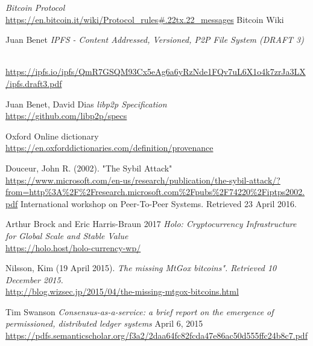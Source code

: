 \documentclass[twocolumn,showpacs,
  nofootinbib,aps,superscriptaddress,
  eqsecnum,prd,notitlepage,showkeys,10pt]{revtex4-1}
\begin{document}
\begin{thebibliography}{9}
\textit{Bitcoin Protocol}
\\\url{https://en.bitcoin.it/wiki/Protocol_rules#.22tx.22_messages}
Bitcoin Wiki

Juan Benet
\textit{IPFS - Content Addressed, Versioned, P2P File System (DRAFT 3)}
\begin{sloppypar}
\\\url{https://ipfs.io/ipfs/QmR7GSQM93Cx5eAg6a6yRzNde1FQv7uL6X1o4k7zrJa3LX/ipfs.draft3.pdf}
\end{sloppypar}

Juan Benet, David Dias
\textit{libp2p Specification}
\\\url{https://github.com/libp2p/specs}

Oxford
Online dictionary
\\\url{https://en.oxforddictionaries.com/definition/provenance}

Douceur, John R. (2002).
"The Sybil Attack"
\\\url{https://www.microsoft.com/en-us/research/publication/the-sybil-attack/?from=http%3A%2F%2Fresearch.microsoft.com%2Fpubs%2F74220%2Fiptps2002.pdf}
International workshop on Peer-To-Peer Systems. Retrieved 23 April 2016.


Arthur Brock and Eric Harris-Braun 2017
\textit{Holo: Cryptocurrency Infrastructure
for Global Scale and Stable Value}
\\\url{https://holo.host/holo-currency-wp/}

 Nilsson, Kim (19 April 2015).
 \textit{The missing MtGox bitcoins". Retrieved 10 December 2015.}
\\\url{http://blog.wizsec.jp/2015/04/the-missing-mtgox-bitcoins.html}

Tim Swanson
\textit{Consensus-as-a-service: a brief report on the emergence of permissioned, distributed ledger systems}
April 6, 2015
\\\url{https://pdfs.semanticscholar.org/f3a2/2daa64fc82fcda47e86ac50d555ffc24b8c7.pdf}

\end{thebibliography}
\end{document}
